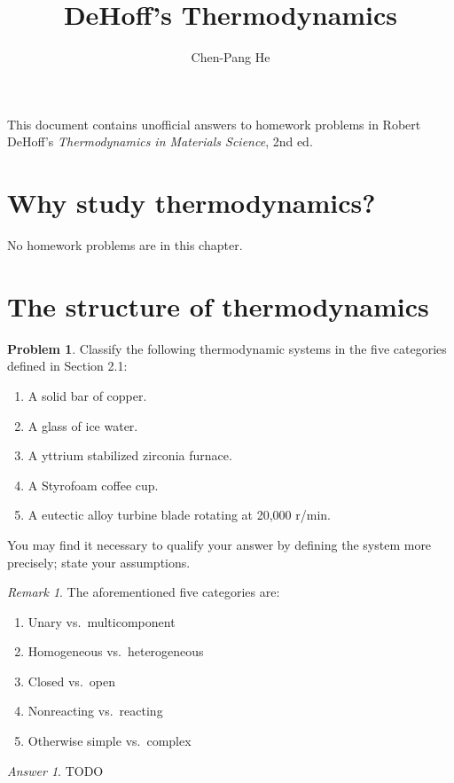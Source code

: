 \documentclass[a4paper, 12pt]{article}
\title{DeHoff's Thermodynamics}
\author{Chen-Pang He}
\theoremstyle{definition}
\newtheorem{problem}{Problem}[section]
\theoremstyle{remark}
\newtheorem*{remark}{Remark}
\newtheorem*{answer}{Answer}
\renewcommand{\theenumi}{\alph{enumi}}
\begin{document}
\maketitle
This document contains unofficial answers to homework problems in Robert
DeHoff's \textit{Thermodynamics in Materials Science}, 2nd ed.

\section{Why study thermodynamics?}
No homework problems are in this chapter.

\section{The structure of thermodynamics}
\begin{problem}
    Classify the following thermodynamic systems in the five categories defined
    in Section 2.1:
    \begin{enumerate}
        \item A solid bar of copper.
        \item A glass of ice water.
        \item A yttrium stabilized zirconia furnace.
        \item A Styrofoam coffee cup.
        \item A eutectic alloy turbine blade rotating at 20,000 r/min.
    \end{enumerate}

    You may find it necessary to qualify your answer by defining the system
    more precisely; state your assumptions.
\end{problem}

\begin{remark}
    \renewcommand{\theenumi}{\arabic{enumi}}
    The aforementioned five categories are:
    \begin{enumerate}
        \item Unary vs.\ multicomponent
        \item Homogeneous vs.\ heterogeneous
        \item Closed vs.\ open
        \item Nonreacting vs.\ reacting
        \item Otherwise simple vs.\ complex
    \end{enumerate}
\end{remark}

\begin{answer}
    TODO
\end{answer}
\end{document}
